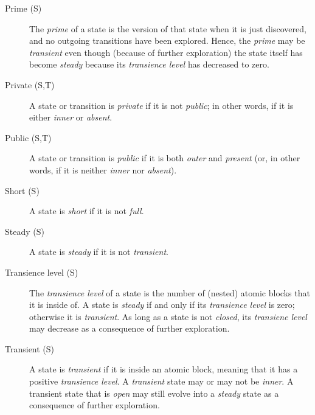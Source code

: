 \documentclass{article}
\begin{document}
\begin{description}
\item[Prime (S)] The \emph{prime} of a state is the version of that state when it is just discovered, and no outgoing transitions have been explored. Hence, the \emph{prime} may be \emph{transient} even though (because of further exploration) the state itself has become \emph{steady} because its \emph{transience level} has decreased to zero.

\item[Private (S,T)] A state or transition is \emph{private} if it is not \emph{public}; in other words, if it is either \emph{inner} or \emph{absent}.

\item[Public (S,T)] A state or transition is \emph{public} if it is both \emph{outer} and \emph{present} (or, in other words, if it is neither \emph{inner} nor \emph{absent}).

\item[Short (S)] A state is \emph{short} if it is not \emph{full}.

\item[Steady (S)] A state is \emph{steady} if it is not \emph{transient}.

\item[Transience level (S)] The \emph{transience level} of a state is the number of (nested) atomic blocks that it is inside of. A state is \emph{steady} if and only if its \emph{transience level} is zero; otherwise it is \emph{transient}. As long as a state is not \emph{closed}, its \emph{transiene level} may decrease as a consequence of further exploration.

\item[Transient (S)] A state is \emph{transient} if it is inside an atomic block, meaning that it has a positive \emph{transience level}. A \emph{transient} state may or may not be \emph{inner}. A transient state that is \emph{open} may still evolve into a \emph{steady} state as a consequence of further exploration.
\end{description}
\end{document}
